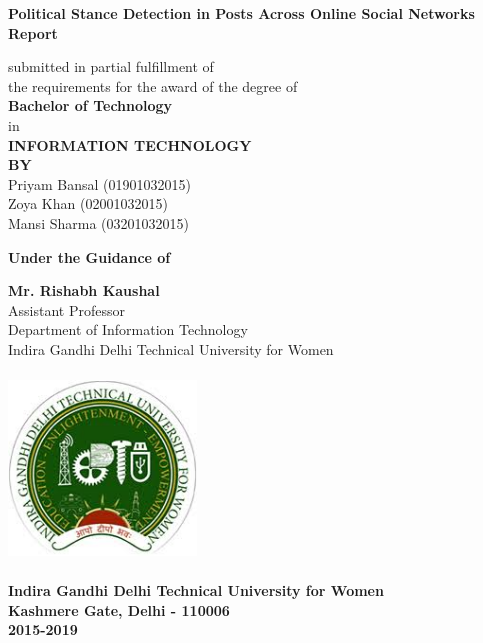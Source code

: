\documentclass[a4paper,11pt]{article}
\begin{document}

\thispagestyle{empty} %

\begin{spacing}{1.5}
\begin{center}

{\LARGE \bfseries
Political Stance Detection in Posts Across Online Social Networks}
\medskip\\
\textbf{ Report}
\begin{center}
submitted in partial fulfillment of\\ 
the requirements for the award of the degree of\\
\textbf{Bachelor of Technology}
\medskip\\
in\\
\textbf{INFORMATION TECHNOLOGY}\\
\textbf{BY}
\medskip\\
Priyam Bansal (01901032015)\\
Zoya Khan (02001032015)\\
Mansi Sharma (03201032015)\\
\end{center}
\begin{center}
\textbf{Under the Guidance of}\\
\end{center}

\begin{center}
\textbf{Mr. Rishabh Kaushal}\\
Assistant Professor\\
Department of Information Technology\\
Indira Gandhi Delhi Technical University for Women
\end{center}
\vspace*{10mm}

\includegraphics[height=5cm,width=5cm]{igdtuw_logo.jpg}

{\LARGE \bfseries
Indira Gandhi Delhi Technical University for Women\\
Kashmere Gate, Delhi - 110006\medskip\\
2015-2019
}

\end{center}
\end{spacing}
\end{document}
